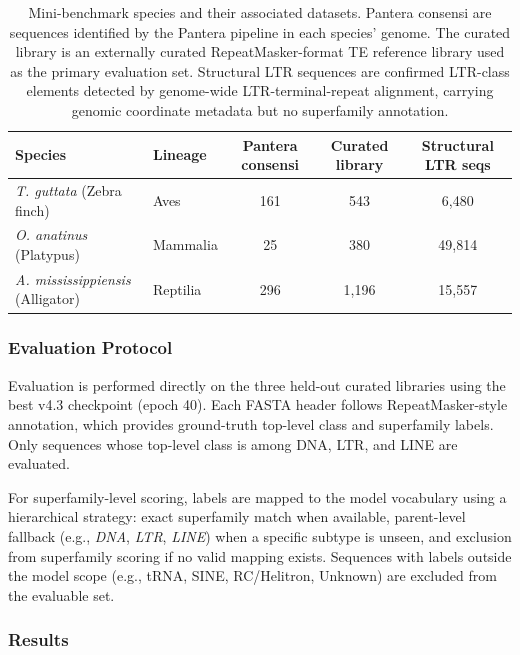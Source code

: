 \documentclass[12pt]{article}
\begin{document}
\begin{table}[h]
\centering
\begin{tabular}{llccc}
\hline
Species & Lineage & Pantera consensi & Curated library & Structural LTR seqs \\
\hline
\textit{T. guttata} (Zebra finch) & Aves & 161 & 543 & 6{,}480 \\
\textit{O. anatinus} (Platypus) & Mammalia & 25 & 380 & 49{,}814 \\
\textit{A. mississippiensis} (Alligator) & Reptilia & 296 & 1{,}196 & 15{,}557 \\
\hline
\end{tabular}
\caption{Mini-benchmark species and their associated datasets. Pantera consensi are sequences identified by the Pantera pipeline in each species' genome. The curated library is an externally curated RepeatMasker-format TE reference library used as the primary evaluation set. Structural LTR sequences are confirmed LTR-class elements detected by genome-wide LTR-terminal-repeat alignment, carrying genomic coordinate metadata but no superfamily annotation.}
\label{tab:mini_benchmark_species}
\end{table}

\subsubsection{Evaluation Protocol}

Evaluation is performed directly on the three held-out curated libraries using the best v4.3 checkpoint (epoch 40). Each FASTA header follows RepeatMasker-style annotation, which provides ground-truth top-level class and superfamily labels. Only sequences whose top-level class is among DNA, LTR, and LINE are evaluated. 

For superfamily-level scoring, labels are mapped to the model vocabulary using a hierarchical strategy: exact superfamily match when available, parent-level fallback (e.g., \textit{DNA}, \textit{LTR}, \textit{LINE}) when a specific subtype is unseen, and exclusion from superfamily scoring if no valid mapping exists. Sequences with labels outside the model scope (e.g., tRNA, SINE, RC/Helitron, Unknown) are excluded from the evaluable set. 

\subsubsection{Results}
\end{document}
